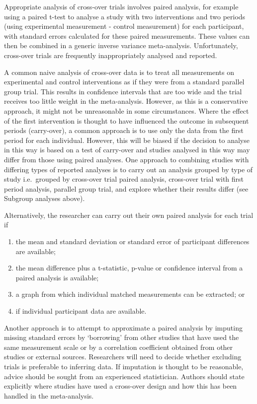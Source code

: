 \documentclass[
  10pt,
  a4paper,
  DIV=11,
  numbers=noendperiod]{scrreprt}
\begin{document}
Appropriate analysis of cross-over trials involves paired analysis, for
example using a paired t-test to analyse a study with two interventions
and two periods (using experimental measurement - control measurement)
for each participant, with standard errors calculated for these paired
measurements. These values can then be combined in a generic inverse
variance meta-analysis. Unfortunately, cross-over trials are frequently
inappropriately analysed and reported.

A common naive analysis of cross-over data is to treat all measurements
on experimental and control interventions as if they were from a
standard parallel group trial. This results in confidence intervals that
are too wide and the trial receives too little weight in the
meta-analysis. However, as this is a conservative approach, it might not
be unreasonable in some circumstances. Where the effect of the first
intervention is thought to have influenced the outcome in subsequent
periods (carry-over), a common approach is to use only the data from the
first period for each individual. However, this will be biased if the
decision to analyse in this way is based on a test of carry-over and
studies analysed in this way may differ from those using paired
analyses. One approach to combining studies with differing types of
reported analyses is to carry out an analysis grouped by type of study
i.e.~grouped by cross-over trial paired analysis, cross-over trial with
first period analysis, parallel group trial, and explore whether their
results differ (see Subgroup analyses above).

Alternatively, the researcher can carry out their own paired analysis
for each trial if

\begin{enumerate}
\def\labelenumi{\arabic{enumi}.}
\item
  the mean and standard deviation or standard error of participant
  differences are available;
\item
  the mean difference plus a t-statistic, p-value or confidence interval
  from a paired analysis is available;
\item
  a graph from which individual matched measurements can be extracted;
  or
\item
  if individual participant data are available.
\end{enumerate}

Another approach is to attempt to approximate a paired analysis by
imputing missing standard errors by `borrowing' from other studies that
have used the same measurement scale or by a correlation coefficient
obtained from other studies or external sources. Researchers will need
to decide whether excluding trials is preferable to inferring data. If
imputation is thought to be reasonable, advice should be sought from an
experienced statistician. Authors should state explicitly where studies
have used a cross-over design and how this has been handled in the
meta-analysis.
\end{document}
